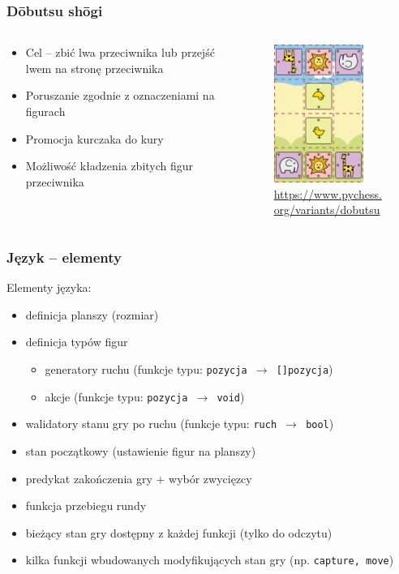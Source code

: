 \documentclass{beamer}
\begin{document}
\begin{frame}
	\frametitle{Dōbutsu shōgi}
	\begin{columns}
		\begin{column}{.48\textwidth}
			\begin{itemize}
				\item Cel -- zbić lwa przeciwnika lub przejść lwem na stronę przeciwnika
				\item Poruszanie zgodnie z oznaczeniami na figurach
				\item Promocja kurczaka do kury
				\item Możliwość kładzenia zbitych figur przeciwnika
			\end{itemize}
		\end{column}%
		\hfill
		\begin{column}{.60\textwidth}
			\begin{figure}
				\includegraphics[height=4.5cm]{dobutsu-shogi.png}
				\centering
				\caption{\url{https://www.pychess.org/variants/dobutsu}}
			\end{figure}
		\end{column}
	\end{columns}
\end{frame}

\begin{frame}
	\frametitle{Język -- elementy}
	Elementy języka:
	\begin{itemize}
		\item definicja planszy (rozmiar)
		\item definicja typów figur
		      \begin{itemize}
			      \item generatory ruchu (funkcje typu: {\tt pozycja $\rightarrow$ []pozycja})
			      \item akcje (funkcje typu: {\tt pozycja $\rightarrow$ void})
		      \end{itemize}
		\item walidatory stanu gry po ruchu (funkcje typu: {\tt ruch $\rightarrow$ bool})
		\item stan początkowy (ustawienie figur na planszy)
		\item predykat zakończenia gry + wybór zwycięzcy
		\item funkcja przebiegu rundy
		\item bieżący stan gry dostępny z każdej funkcji (tylko do odczytu)
		\item kilka funkcji wbudowanych modyfikujących stan gry (np. {\tt capture, move})
	\end{itemize}
\end{frame}
\end{document}
